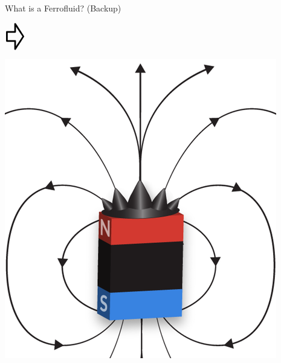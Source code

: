 \documentclass[9pt]{beamer}
\newcommand*{\vpointer}{\vcenter{\hbox{\scalebox{2}{\Huge\pointer}}}}
\begin{document}
\begin{frame}{What is a Ferrofluid? (Backup)}
\begin{minipage}{.4\paperwidth}
	\end{minipage}%
	\begin{minipage}{.1\paperwidth}
		$\vpointer$
	\end{minipage}%
	\begin{minipage}{.3\paperwidth}
		\centering
		\includegraphics[scale=.18]{FerroExplain.png}
	\end{minipage}
\end{frame}
\end{document}
